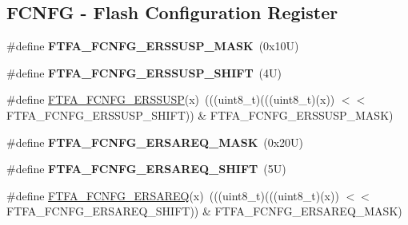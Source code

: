 \subsection*{F\+C\+N\+FG -\/ Flash Configuration Register}
\begin{DoxyCompactItemize}
\item 
\mbox{\label{group___f_t_f_a___register___masks_ga0fc6d10ebdf1a45172f3c8291fdee94c}} 
\#define {\bfseries F\+T\+F\+A\+\_\+\+F\+C\+N\+F\+G\+\_\+\+E\+R\+S\+S\+U\+S\+P\+\_\+\+M\+A\+SK}~(0x10\+U)
\item 
\mbox{\label{group___f_t_f_a___register___masks_ga7586fcfe862202cd864fec542db66458}} 
\#define {\bfseries F\+T\+F\+A\+\_\+\+F\+C\+N\+F\+G\+\_\+\+E\+R\+S\+S\+U\+S\+P\+\_\+\+S\+H\+I\+FT}~(4\+U)
\item 
\#define \mbox{\hyperlink{group___f_t_f_a___register___masks_gad649f1c9e369528928f6ee12ea12693f}{F\+T\+F\+A\+\_\+\+F\+C\+N\+F\+G\+\_\+\+E\+R\+S\+S\+U\+SP}}(x)~(((uint8\+\_\+t)(((uint8\+\_\+t)(x)) $<$$<$ F\+T\+F\+A\+\_\+\+F\+C\+N\+F\+G\+\_\+\+E\+R\+S\+S\+U\+S\+P\+\_\+\+S\+H\+I\+FT)) \& F\+T\+F\+A\+\_\+\+F\+C\+N\+F\+G\+\_\+\+E\+R\+S\+S\+U\+S\+P\+\_\+\+M\+A\+SK)
\item 
\mbox{\label{group___f_t_f_a___register___masks_gac92e8d3d354f7352b8bd61086327d16d}} 
\#define {\bfseries F\+T\+F\+A\+\_\+\+F\+C\+N\+F\+G\+\_\+\+E\+R\+S\+A\+R\+E\+Q\+\_\+\+M\+A\+SK}~(0x20\+U)
\item 
\mbox{\label{group___f_t_f_a___register___masks_ga0879413588f696dfe9f6a1c849103753}} 
\#define {\bfseries F\+T\+F\+A\+\_\+\+F\+C\+N\+F\+G\+\_\+\+E\+R\+S\+A\+R\+E\+Q\+\_\+\+S\+H\+I\+FT}~(5\+U)
\item 
\#define \mbox{\hyperlink{group___f_t_f_a___register___masks_gaa3b949d86755b3f62bf38394d943f72f}{F\+T\+F\+A\+\_\+\+F\+C\+N\+F\+G\+\_\+\+E\+R\+S\+A\+R\+EQ}}(x)~(((uint8\+\_\+t)(((uint8\+\_\+t)(x)) $<$$<$ F\+T\+F\+A\+\_\+\+F\+C\+N\+F\+G\+\_\+\+E\+R\+S\+A\+R\+E\+Q\+\_\+\+S\+H\+I\+FT)) \& F\+T\+F\+A\+\_\+\+F\+C\+N\+F\+G\+\_\+\+E\+R\+S\+A\+R\+E\+Q\+\_\+\+M\+A\+SK)
\item 
\mbox{\label{group___f_t_f_a___register___masks_gae9ad4a9aac7c5ef332e4c7d7af0a63a9}} 

\end{DoxyCompactItemize}
